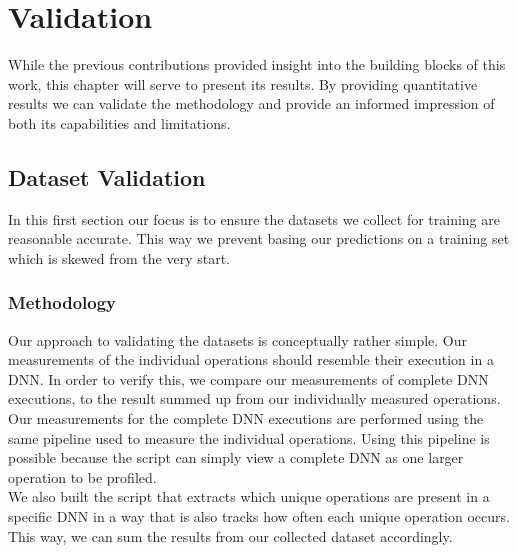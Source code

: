 \chapter{Validation}\label{chap:contrib3}

While the previous contributions provided insight into the building blocks of this work, this chapter will serve to present its results. By providing quantitative results we can validate the methodology and provide an informed impression of both its capabilities and limitations. 


\section{Dataset Validation}
In this first section our focus is to ensure the datasets we collect for training are reasonable accurate. This way we prevent basing our predictions on a training set which is skewed from the very start.

\subsection{Methodology}
Our approach to validating the datasets is conceptually rather simple. Our measurements of the individual operations should resemble their execution in a DNN. In order to verify this, we compare our measurements of complete DNN executions, to the result summed up from our individually measured operations. \\
Our measurements for the complete DNN executions are performed using the same pipeline used to measure the individual operations. Using this pipeline is possible because the script can simply view a complete DNN as one larger operation to be profiled.\\
We also built the script that extracts which unique operations are present in a specific DNN in a way that is also tracks how often each unique operation occurs. This way, we can sum the results from our collected dataset accordingly.


